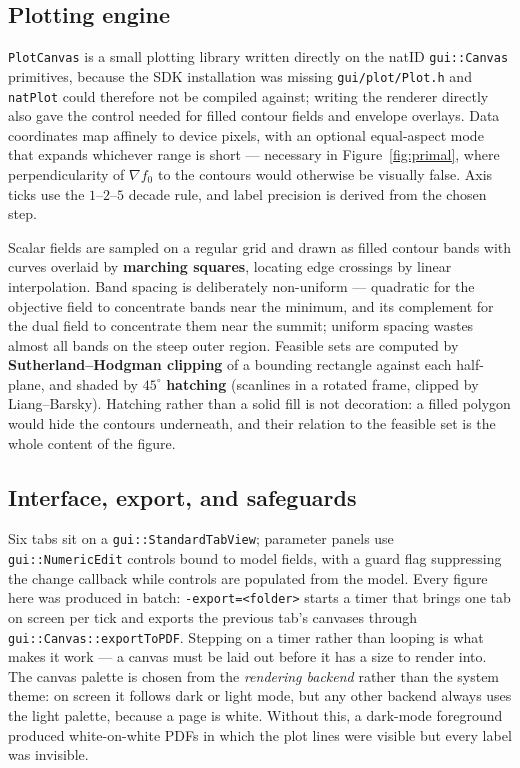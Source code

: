 \documentclass[11pt,a4paper]{article}
\theoremstyle{definition}
\begin{document}
\subsection{Plotting engine}

\texttt{PlotCanvas} is a small plotting library written directly on the natID
\texttt{gui::Canvas} primitives, because the SDK installation was missing
\texttt{gui/plot/Plot.h} and \texttt{natPlot} could therefore not be compiled against; writing
the renderer directly also gave the control needed for filled contour fields and envelope
overlays. Data coordinates map affinely to device pixels, with an optional equal-aspect mode that
expands whichever range is short --- necessary in Figure~\ref{fig:primal}, where perpendicularity
of $\nabla f_{0}$ to the contours would otherwise be visually false. Axis ticks use the
$1$--$2$--$5$ decade rule, and label precision is derived from the chosen step.

Scalar fields are sampled on a regular grid and drawn as filled contour bands with curves
overlaid by \textbf{marching squares}, locating edge crossings by linear interpolation. Band
spacing is deliberately non-uniform --- quadratic for the objective field to concentrate bands
near the minimum, and its complement for the dual field to concentrate them near the summit;
uniform spacing wastes almost all bands on the steep outer region. Feasible sets are computed by
\textbf{Sutherland--Hodgman clipping} of a bounding rectangle against each half-plane, and shaded
by $45^{\circ}$ \textbf{hatching} (scanlines in a rotated frame, clipped by Liang--Barsky).
Hatching rather than a solid fill is not decoration: a filled polygon would hide the contours
underneath, and their relation to the feasible set is the whole content of the figure.

\subsection{Interface, export, and safeguards}

Six tabs sit on a \texttt{gui::StandardTabView}; parameter panels use \texttt{gui::NumericEdit}
controls bound to model fields, with a guard flag suppressing the change callback while controls
are populated from the model. Every figure here was produced in batch:
\texttt{-export=<folder>} starts a timer that brings one tab on screen per tick and exports the
previous tab's canvases through \texttt{gui::Canvas::exportToPDF}. Stepping on a timer rather
than looping is what makes it work --- a canvas must be laid out before it has a size to render
into. The canvas palette is chosen from the \emph{rendering backend} rather than the system
theme: on screen it follows dark or light mode, but any other backend always uses the light
palette, because a page is white. Without this, a dark-mode foreground produced white-on-white
PDFs in which the plot lines were visible but every label was invisible.
\end{document}
